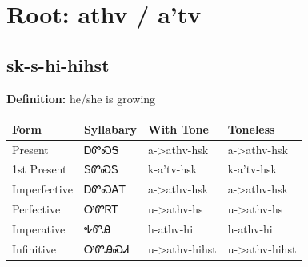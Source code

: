 \documentclass{article}%
\begin{document}
%
\normalsize%
\section*{Root: athv / a'tv}%
\subsection*{sk-s-hi-hihst}%
\textbf{Definition: }%
he/she is growing%
\\[0.5em]%
\begin{tabular}{|l|l|l|l|}%
\hline%
\textbf{Form}&\textbf{Syllabary}&\textbf{With Tone}&\textbf{Toneless}\\%
\hline%
Present&ᎠᏛᏍᎦ&a{-}>athv{-}hsk&a{-}>athv{-}hsk\\%
1st Present&ᎦᏛᏍᎦ&k{-}a'tv{-}hsk&k{-}a'tv{-}hsk\\%
Imperfective&ᎠᏛᏍᎪᎢ&a{-}>athv{-}hsk&a{-}>athv{-}hsk\\%
Perfective&ᎤᏛᏒᎢ&u{-}>athv{-}hs&u{-}>athv{-}hs\\%
Imperative&ᎭᏛᎯ&h{-}athv{-}hi&h{-}athv{-}hi\\%
Infinitive&ᎤᏛᎯᏍᏗ&u{-}>athv{-}hihst&u{-}>athv{-}hihst\\%
\hline%
\end{tabular}%
\\[1em]%
\end{document}
